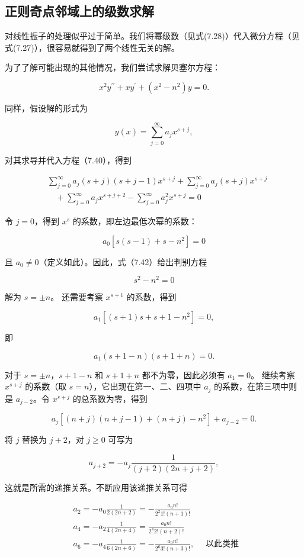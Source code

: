 \subsection{正则奇点邻域上的级数求解}
对线性振子的处理似乎过于简单。我们将幂级数（见式(7.28)）代入微分方程（见式(7.27)），很容易就得到了两个线性无关的解。

为了了解可能出现的其他情况，我们尝试求解贝塞尔方程：

$$
x^2 y^{\prime \prime}+x y^{\prime}+\left(x^2-n^2\right) y=0 .
$$

同样，假设解的形式为

$$
y(x)=\sum_{j=0}^{\infty} a_j x^{s+j},
$$

对其求导并代入方程（7.40），得到

$$
\begin{aligned}
& \sum_{j=0}^{\infty} a_j(s+j)(s+j-1) x^{s+j}+\sum_{j=0}^{\infty} a_j(s+j) x^{s+j} \\
& \quad+\sum_{j=0}^{\infty} a_j x^{s+j+2}-\sum_{j=0}^{\infty} a_j^2 x^{s+j}=0
\end{aligned}
$$

令 $j=0$，得到 $x^s$ 的系数，即左边最低次幂的系数：

$$
a_0\left[s(s-1)+s-n^2\right]=0
$$

且 $a_0 \neq 0$（定义如此）。因此，式（7.42）给出判别方程

$$
s^2-n^2=0
$$

解为 $s= \pm n$。
还需要考察 $x^{s+1}$ 的系数，得到

$$
a_1\left[(s+1) s+s+1-n^2\right]=0,
$$

即

$$
a_1(s+1-n)(s+1+n)=0 .
$$

对于 $s= \pm n$，$s+1-n$ 和 $s+1+n$ 都不为零，因此必须有 $a_1=0$。
继续考察 $x^{s+j}$ 的系数（取 $s=n$），它出现在第一、二、四项中 $a_j$ 的系数，在第三项中则是 $a_{j-2}$。令 $x^{s+j}$ 的总系数为零，得到

$$
a_j\left[(n+j)(n+j-1)+(n+j)-n^2\right]+a_{j-2}=0 .
$$

将 $j$ 替换为 $j+2$，对 $j \geq 0$ 可写为

$$
a_{j+2}=-a_j \frac{1}{(j+2)(2 n+j+2)},
$$

这就是所需的递推关系。不断应用该递推关系可得

$$
\begin{aligned}
& a_2=-a_0 \frac{1}{2(2 n+2)}=-\frac{a_0 n!}{2^2 1!(n+1)!} \\
& a_4=-a_2 \frac{1}{4(2 n+4)}=\frac{a_0 n!}{2^4 2!(n+2)!} \\
& a_6=-a_4 \frac{1}{6(2 n+6)}=-\frac{a_0 n!}{2^6 3!(n+3)!}, \quad \text { 以此类推 }
\end{aligned}
$$

